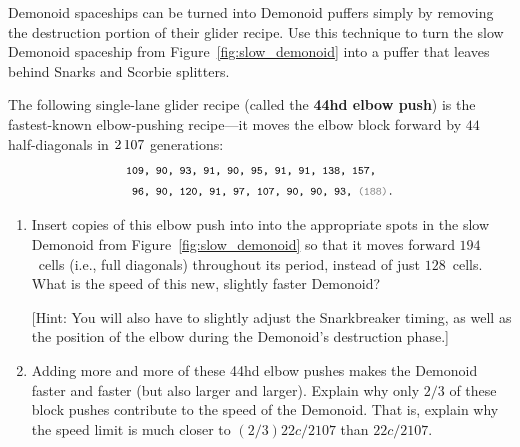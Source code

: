 \begin{multicols}{2}
	
	\begin{problem}\label{exer:demonoid_turn_into_puffer} 
		Demonoid spaceships can be turned into Demonoid puffers simply by removing the destruction portion of their glider recipe. Use this technique to turn the slow Demonoid spaceship from Figure~\ref{fig:slow_demonoid} into a puffer that leaves behind Snarks and Scorbie splitters.
	\end{problem}
	
	
	\mfilbreak
	
	
	\begin{problemstar}\label{exer:44hd_elbow_push} 
		The following single-lane glider recipe (called the \textbf{44hd elbow push}) is the fastest-known elbow-pushing recipe---it moves the elbow block forward by $44$ half-diagonals in $2{\,}107$ generations:
		\begin{align*}
		& \text{\texttt{\footnotesize 109, 90, 93, 91, 90, 95, 91, 91, 138, 157,}} \\
		& \text{\texttt{\footnotesize~96, 90, 120, 91, 97, 107, 90, 90, 93, {\color{gray}(188)}.}}
		\end{align*}
		
		\begin{center}
			\centering
		\end{center}
		
		\begin{enumerate}[label=\bf\color{ocre}(\alph*)]
			\item Insert copies of this elbow push into into the appropriate spots in the slow Demonoid from Figure~\ref{fig:slow_demonoid} so that it moves forward $194$~cells (i.e., full diagonals) throughout its period, instead of just $128$~cells. What is the speed of this new, slightly faster Demonoid?
			
			[Hint: You will also have to slightly adjust the Snarkbreaker timing, as well as the position of the elbow during the Demonoid's destruction phase.]
			
			\item Adding more and more of these 44hd elbow pushes makes the Demonoid faster and faster (but also larger and larger). Explain why only $2/3$ of these block pushes contribute to the speed of the Demonoid. That is, explain why the speed limit is much closer to $(2/3)22c/2107$ than $22c/2107$.
			

\end{enumerate}
\end{problemstar}
\end{multicols}
